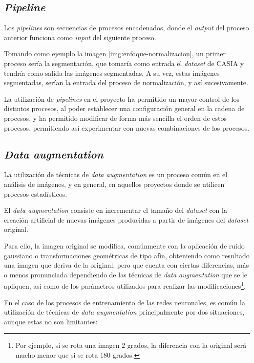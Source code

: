 \subsection{\textit{Pipeline}}

Los \textit{pipelines} son secuencias de procesos encadenados, donde el \textit{output} del proceso anterior funciona como \textit{input} del siguiente proceso.

Tomando como ejemplo la imagen \ref{img:enfoque-normalizacion}, un primer proceso sería la segmentación, que tomaría como entrada el \textit{dataset} de CASIA y tendría como salida 
las imágenes segmentadas. A su vez, estas imágenes segmentadas, serían la entrada del proceso de normalización, y así sucesivamente.

La utilización de \textit{pipelines} en el proyecto ha permitido un mayor control de los distintos procesos, al poder establecer una configuración general en la cadena de procesos, y ha permitido modificar de forma más sencilla el orden de estos procesos, permitiendo así experimentar con nuevas combinaciones de los procesos.

\subsection{\textit{Data augmentation}}\label{dataaugmentation}

La utilización de técnicas de \textit{data augmentation} es un proceso común en el análisis de imágenes, y en general, en aquellos proyectos donde se utilicen procesos estadísticos. 

El \textit{data augmentation} consiste en incrementar el tamaño del \textit{dataset} con la creación artificial de nuevas imágenes producidas a partir de imágenes del \textit{dataset} original.

Para ello, la imagen original se modifica, comúnmente con la aplicación de ruido gaussiano o transformaciones geométricas de tipo afín, obteniendo como resultado una imagen que deriva de la original, pero que cuenta con ciertas diferencias, más o menos pronunciada dependiendo de las técnicas 
de \textit{data augmentation} que se le apliquen, así como de los parámetros utilizados para realizar las modificaciones\footnote{Por ejemplo, si se rota una imagen 2 grados, la diferencia con la original será mucho menor que si se rota 180 grados.}.	

En el caso de los procesos de entrenamiento de las redes neuronales, es común la utilización de técnicas de \textit{data augmentation} principalmente por dos situaciones, aunque estas no son limitantes:

